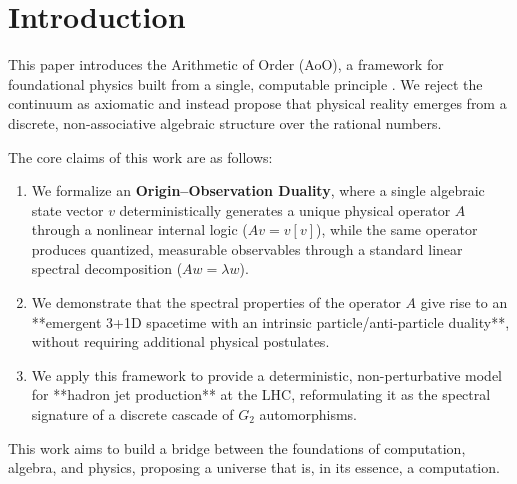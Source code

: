 \documentclass[11pt, a4paper]{article}
\theoremstyle{definition}
\theoremstyle{remark}
\begin{document}
\tableofcontents
\newpage

\section*{Introduction}
This paper introduces the Arithmetic of Order (AoO), a framework for foundational physics built from a single, computable principle \cite{EK2025Hardron, EK2025a}. We reject the continuum as axiomatic and instead propose that physical reality emerges from a discrete, non-associative algebraic structure over the rational numbers.

The core claims of this work are as follows:
\begin{enumerate}
    \item We formalize an \textbf{Origin–Observation Duality}, where a single algebraic state vector $v$ deterministically generates a unique physical operator $A$ through a nonlinear internal logic ($Av=v[v]$), while the same operator produces quantized, measurable observables through a standard linear spectral decomposition ($Aw = \lambda w$).
    \item We demonstrate that the spectral properties of the operator $A$ give rise to an **emergent 3+1D spacetime with an intrinsic particle/anti-particle duality**, without requiring additional physical postulates.
    \item We apply this framework to provide a deterministic, non-perturbative model for **hadron jet production** at the LHC, reformulating it as the spectral signature of a discrete cascade of $G_2$ automorphisms.
\end{enumerate}
This work aims to build a bridge between the foundations of computation, algebra, and physics, proposing a universe that is, in its essence, a computation.
\end{document}
